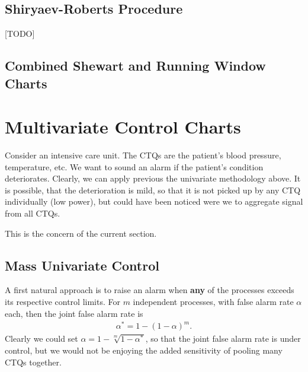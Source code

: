 \subsection{Shiryaev-Roberts Procedure}
[TODO]





\subsection{Combined Shewart and Running Window Charts}






\begin{extra}
\end{extra}








\section{Multivariate Control Charts}
\label{sec:multivariate}

\begin{example}
\label{eg:intensive}
Consider an intensive care unit. 
The CTQs are the patient's blood pressure, temperature, etc.
We want to sound an alarm if the patient's condition deteriorates. 
Clearly, we can apply previous the univariate methodology above. 
It is possible, that the deterioration is mild, so that it is not picked up by any CTQ individually (low power), but could have been noticed were we to aggregate signal from all CTQs. 
\end{example}
This is the concern of the current section. 

\subsection{Mass Univariate Control}
\label{sec:mass_univariate}

A first natural approach is to raise an alarm when \textbf{any} of the processes exceeds its respective control limits.
For $m$ independent processes, with false alarm rate $\alpha$ each, then the joint false alarm rate is 
\begin{align}
	\alpha^* = 1-(1-\alpha)^m.
\end{align}
Clearly we could set $\alpha=1-\sqrt[m]{1-\alpha^*}$, so that the joint false alarm rate is under control, but we would not be enjoying the added sensitivity of pooling many CTQs together. 



